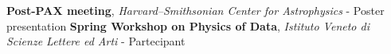 %
%
%


\begin{contents}
					{\textbf{Post-PAX meeting}, \emph{Harvard–Smithsonian Center for Astrophysics} - Poster presentation}	
					{\textbf{Spring Workshop on Physics of Data}, \emph{Istituto Veneto di Scienze Lettere ed Arti} - Partecipant}
     
\end{contents}
\medskip
